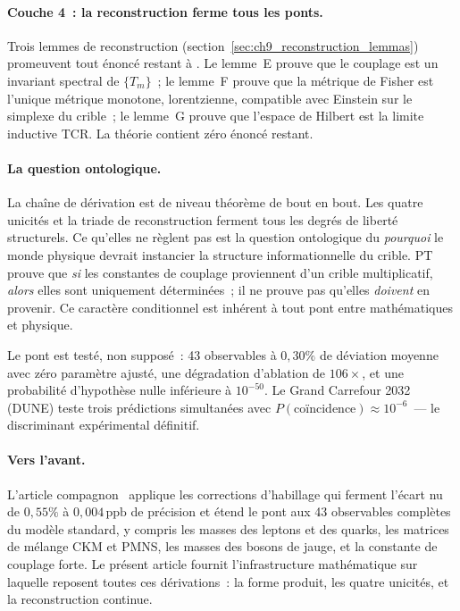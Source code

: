 \documentclass[12pt,a4paper]{article}
\begin{document}
\paragraph{Couche 4~: la reconstruction ferme tous les ponts.}
Trois lemmes de reconstruction
(section~\ref{sec:ch9_reconstruction_lemmas}) promeuvent tout
énoncé \BRIDGETAG{} restant à \THMTAG. Le lemme~E prouve que le
couplage est un invariant spectral de $\{T_m\}$~; le lemme~F prouve
que la métrique de Fisher est l'unique métrique monotone,
lorentzienne, compatible avec Einstein sur le simplexe du crible~;
le lemme~G prouve que l'espace de Hilbert est la limite inductive
TCR. La théorie contient zéro énoncé \BRIDGETAG{} restant.

\paragraph{La question ontologique.}
La chaîne de dérivation est de niveau théorème de bout en bout.
Les quatre unicités et la triade de reconstruction ferment tous
les degrés de liberté structurels. Ce qu'elles ne règlent pas est
la question ontologique du \emph{pourquoi} le monde physique
devrait instancier la structure informationnelle du crible. PT
prouve que \emph{si} les constantes de couplage proviennent d'un
crible multiplicatif, \emph{alors} elles sont uniquement
déterminées~; il ne prouve pas qu'elles \emph{doivent} en provenir.
Ce caractère conditionnel est inhérent à tout pont entre
mathématiques et physique.

Le pont est testé, non supposé~: 43 observables à $0{,}30\%$ de
déviation moyenne avec zéro paramètre ajusté, une dégradation
d'ablation de $106\times$, et une probabilité d'hypothèse nulle
inférieure à $10^{-50}$. Le Grand Carrefour 2032 (DUNE) teste
trois prédictions simultanées avec
$P(\text{coïncidence}) \approx 10^{-6}$~--- le discriminant
expérimental définitif.

\paragraph{Vers l'avant.}
L'article compagnon~\cite{companion_physics} applique les
corrections d'habillage qui ferment l'écart nu de $0{,}55\%$ à
$0{,}004\,\mathrm{ppb}$ de précision et étend le pont aux 43
observables complètes du modèle standard, y compris les masses
des leptons et des quarks, les matrices de mélange CKM et PMNS,
les masses des bosons de jauge, et la constante de couplage forte.
Le présent article fournit l'infrastructure mathématique sur
laquelle reposent toutes ces dérivations~: la forme produit, les
quatre unicités, et la reconstruction continue.
\end{document}
